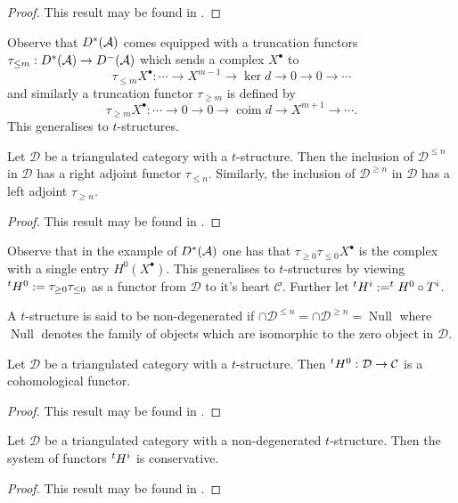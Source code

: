 \begin{proof}
  This result may be found in \cite[Chapter 5]{dimca2004sheaves}.
\end{proof}
Observe that $D^*(\AA)$ comes equipped with a truncation functors
$\tau_{\leq m}:D^*(\AA)\to D^-(\AA)$ which sends a complex $X^\bullet$ to
$$\tau_{\leq m}X^\bullet : \cdots \to X^{m-1} \to \ker d \to 0 \to 0 \to \cdots$$
and similarly a truncation functor $\tau_{\geq m}$ is defined by
$$\tau_{\geq m}X^\bullet: \cdots \to 0 \to 0 \to \operatorname{coim} d \to X^{m+1}\to \cdots.$$
This generalises to $t$-structures.
\begin{proposition}
 Let $\mathcal{D}$ be a triangulated category with a $t$-structure.
 Then the inclusion of $\mathcal{D}^{\leq n}$ in $\mathcal{D}$ has a right adjoint functor $\tau_{\leq n}$.
 Similarly, the inclusion of $\mathcal{D}^{\geq n}$ in $\mathcal{D}$ has a left adjoint $\tau_{\geq n}$.
\end{proposition}
\begin{proof}
  This result may be found in \cite[Chapter 5]{dimca2004sheaves}.
\end{proof}
Observe that in the example of $D^*(\AA)$ one has that $\tau_{\geq 0} \tau_{\leq 0} X^\bullet$ is the complex with a single entry $H^0(X^\bullet)$.
This generalises to $t$-structures by viewing $\tH^0:= \tau_{\geq 0}\tau_{\leq 0}$ as a functor from $\mathcal{D}$ to it's heart $\mathcal{C}$.
Further let $\tH^i:= \tH^0 \circ T^i$.
\begin{definition}
 A $t$-structure is said to be non-degenerated if $\cap \mathcal{D}^{\leq n} = \cap \mathcal{D}^{\geq n}= \operatorname{Null}$ where $\operatorname{Null}$ denotes the family of objects which are isomorphic to the zero object in $\mathcal{D}$.
\end{definition}
\begin{proposition}
 Let $\mathcal{D}$ be a triangulated category with a $t$-structure. Then $\tH^0:\mathcal{D}\to \mathcal{C}$ is a cohomological functor.
\end{proposition}
\begin{proof}
  This result may be found in \cite[Chapter 5]{dimca2004sheaves}.
\end{proof}
\begin{proposition}
 Let $\mathcal{D}$ be a triangulated category with a non-degenerated $t$-structure. Then the system of functors $\tH^i$ is conservative.
\end{proposition}
\begin{proof}
  This result may be found in \cite[Chapter 5]{dimca2004sheaves}.
\end{proof}
